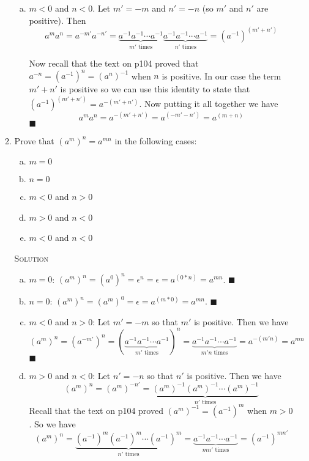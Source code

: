 \documentclass[twoside]{amsart}
\newcommand{\solution}{\textsc{Solution}\xspace}
\newcommand{\blank}{\vspace{5pt}}
\renewcommand{\qed}{\blacksquare}
\begin{document}
\begin{enumerate}[A.]
\begin{enumerate}[1]
\begin{enumerate}[(a)]
         \item $m<0$ and $n<0$. Let $m'=-m$ and $n'=-n$ (so $m'$ and
         $n'$ are positive). Then
         \[a^m a^n = a^{-m'} a^{-n'} = \underbrace{a^{-1} a^{-1}
         \cdots a^{-1}}_{m'\text{ times}} \underbrace{a^{-1} a^{-1} \cdots
         a^{-1}}_{n'\text{ times}} = (a^{-1})^{(m'+n')} \]

         Now recall that the text on p104 proved that $a^{-n} =
         (a^{-1})^n = (a^n)^{-1}$ when $n$ is positive. In our
         case the term $m'+n'$ is positive so we can use
         this identity to state that $(a^{-1})^{(m'+n')} = 
         a^{-(m'+n')}$. Now putting it all together we have
         \[
         a^m a^n = a^{-(m'+n')} = a^{(-m' - n')} = a^{(m+n)} 
         \]
         $\qed$

      \end{enumerate}

      \blank
      \item Prove that $(a^m)^n = a^{mn}$ in the following cases:
      \begin{enumerate}[(a)]
         \item $m=0$
         \item $n=0$
         \item $m<0$ and $n>0$
         \item $m>0$ and $n<0$
         \item $m<0$ and $n<0$
      \end{enumerate}

      \blank \noindent \solution
      \begin{enumerate}[(a)]
         \item $m=0$: $(a^m)^n = (a^0)^n = \epsilon^n = \epsilon
         = a^{(0*n)} = a^{mn}$. $\qed$

         \item $n=0$: $(a^m)^n = (a^m)^0 = \epsilon = a^{(m*0)} =
         a^{mn}$. $\qed$

         \item $m<0$ and $n>0$: Let $m' = -m$ so that $m'$ is positive.
         Then we have
         \[
            (a^m)^n = (a^{-m'})^n = (\underbrace{a^{-1} a^{-1} \cdots
            a^{-1}}_{m'\text{ times}})^n = \underbrace{a^{-1} a^{-1} \cdots
            a^{-1}}_{m'n\text{ times}} = a^{-(m'n)} = a^{mn}
         \] $\qed$

         \item $m>0$ and $n<0$: Let $n' = -n$ so that $n'$ is positive.
         Then we have
         \[
            (a^m)^n = (a^m)^{-n'} = \underbrace{(a^m)^{-1} (a^m)^{-1} 
            \cdots (a^m)^{-1}}_{ n'\text{ times}}
         \]
         Recall that the text on p104 proved $(a^m)^{-1} = (a^{-1})^m$ when
         $m >0$. So we have
         \[
           (a^m)^n = \underbrace{(a^{-1})^m (a^{-1})^m \cdots (a^{-1})^m}_{
           n'\text{ times}} = \underbrace{a^{-1} a^{-1} \cdots a^{-1}}_{
           mn'\text{ times}} = (a^{-1})^{mn'}
         \]


\end{enumerate}
\end{enumerate}
\end{enumerate}
\end{document}
